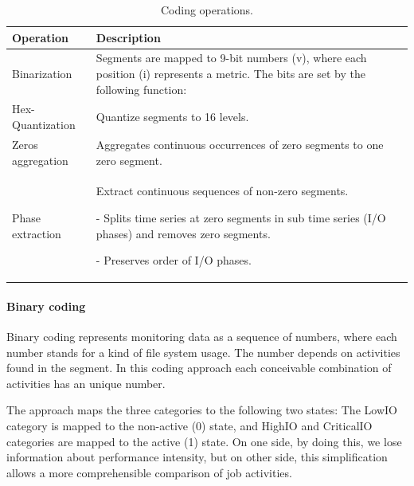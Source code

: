 \documentclass[]{llncs}
\makeatletter
\newcommand{\eb}[1]{\todo[inline]{EB:\@#1}}
\makeatother
\begin{document}
\begin{table}
  \centering
  \begin{tabular}{ll}
    \hline
    Operation &  Description \\
    \hline
    Binarization & Segments are mapped to 9-bit numbers (v), where each position (i) represents a metric. The bits are set by the following function: \eb{equation missing}\\
    \hline
    Hex-Quantization & Quantize segments to 16 levels. \\
    \hline
    Zeros aggregation & Aggregates continuous occurrences of zero segments to one zero segment. \\
    \hline 
    Phase extraction &  Extract continuous sequences of non-zero segments. \par - Splits time series at zero segments in sub time series (I/O phases) and removes zero segments. \par - Preserves order of I/O phases. \\
    \hline

  \end{tabular}
  \caption{Coding operations.}
  \label{tab:coding_ops}
\end{table}


\paragraph{Binary coding}
Binary coding represents monitoring data as a sequence of numbers, where each number stands for a kind of file system usage.
The number depends on activities found in the segment.
In this coding approach each conceivable combination of activities has an unique number.

The approach maps the three categories to the following two states: The LowIO category is mapped to the non-active (0) state, and HighIO and CriticalIO categories are mapped to the active (1) state.
On one side, by doing this, we lose information about performance intensity, but on other side, this simplification allows a more comprehensible comparison of job activities.
\end{document}
